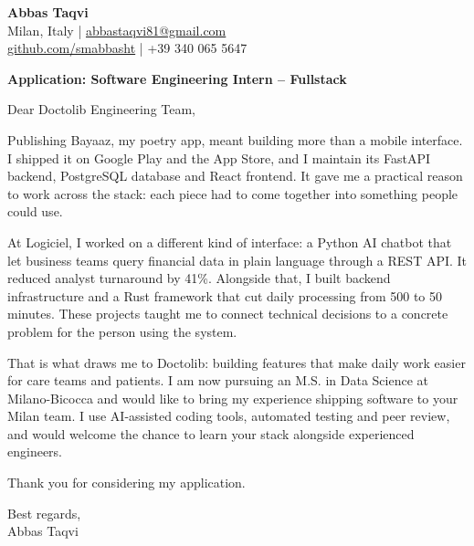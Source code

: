 \documentclass[a4paper,11pt]{article}
\begin{document}
{\Large\bfseries Abbas Taqvi}\\[4pt]
Milan, Italy \enspace | \href{mailto:abbastaqvi81@gmail.com}{abbastaqvi81@gmail.com}\\
\href{https://github.com/smabbasht}{github.com/smabbasht} \enspace | +39 340 065 5647

\vspace{1.2em}
\textbf{Application: Software Engineering Intern -- Fullstack}

Dear Doctolib Engineering Team,

Publishing Bayaaz, my poetry app, meant building more than a mobile interface. I shipped it on Google Play and the App Store, and I maintain its FastAPI backend, PostgreSQL database and React frontend. It gave me a practical reason to work across the stack: each piece had to come together into something people could use.

At Logiciel, I worked on a different kind of interface: a Python AI chatbot that let business teams query financial data in plain language through a REST API. It reduced analyst turnaround by 41\%. Alongside that, I built backend infrastructure and a Rust framework that cut daily processing from 500 to 50 minutes. These projects taught me to connect technical decisions to a concrete problem for the person using the system.

That is what draws me to Doctolib: building features that make daily work easier for care teams and patients. I am now pursuing an M.S. in Data Science at Milano-Bicocca and would like to bring my experience shipping software to your Milan team. I use AI-assisted coding tools, automated testing and peer review, and would welcome the chance to learn your stack alongside experienced engineers.

Thank you for considering my application.

Best regards,\\
Abbas Taqvi
\end{document}
